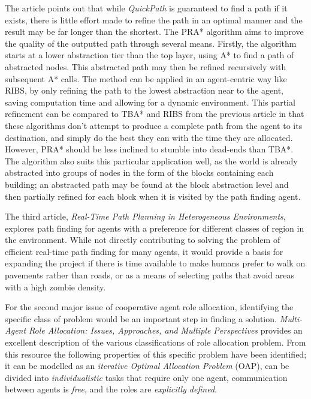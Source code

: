 \documentclass[12pt,a4paper]{article}
\begin{document}
The article points out that while \emph{QuickPath} is guaranteed to find a path if it exists, there is little effort made to refine the path in an optimal manner and the result may be far longer than the shortest. The PRA* algorithm aims to improve the quality of the outputted path through several means. Firstly, the algorithm starts at a lower abstraction tier than the top layer, using A* to find a path of abstracted nodes. This abstracted path may then be refined recursively with subsequent A* calls. The method can be applied in an agent-centric way like RIBS, by only refining the path to the lowest abstraction near to the agent, saving computation time and allowing for a dynamic environment. This partial refinement can be compared to TBA* and RIBS from the previous article in that these algorithms don't attempt to produce a complete path from the agent to its destination, and simply do the best they can with the time they are allocated. However, PRA* should be less inclined to stumble into dead-ends than TBA*. The algorithm also suits this particular application well, as the world is already abstracted into groups of nodes in the form of the blocks containing each building; an abstracted path may be found at the block abstraction level and then partially refined for each block when it is visited by the path finding agent.

The third article, \emph{Real-Time Path Planning in Heterogeneous Environments}\cite{jaklin13}, explores path finding for agents with a preference for different classes of region in the environment. While not directly contributing to solving the problem of efficient real-time path finding for many agents, it would provide a basis for expanding the project if there is time available to make humans prefer to walk on pavements rather than roads, or as a means of selecting paths that avoid areas with a high zombie density.

For the second major issue of cooperative agent role allocation, identifying the specific class of problem would be an important step in finding a solution. \emph{Multi-Agent Role Allocation: Issues, Approaches, and Multiple Perspectives}\cite{campbell11} provides an excellent description of the various classifications of role allocation problem. From this resource the following properties of this specific problem have been identified; it can be modelled as an \emph{iterative Optimal Allocation Problem} (OAP), can be divided into \emph{individualistic} tasks that require only one agent, communication between agents is \emph{free}, and the roles are \emph{explicitly defined}.
\end{document}
